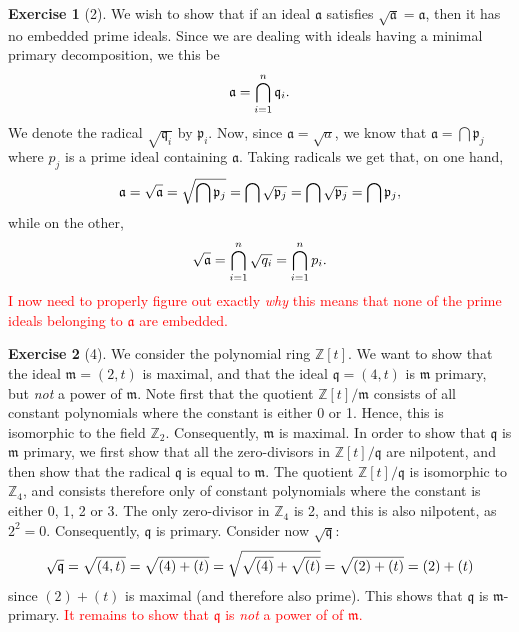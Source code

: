 \documentclass{article}
\theoremstyle{definition}
\newtheorem*{exercise}{Exercise}
\renewcommand{\a}{\mathfrak{a}}
\renewcommand{\p}{\mathfrak{p}}
\renewcommand{\m}{\mathfrak{m}}
\renewcommand{\q}{\mathfrak{q}}
\renewcommand{\rad}[1]{\sqrt{#1}}
\renewcommand{\Z}{\mathbb{Z}}
\begin{document}
\begin{exercise}[2]
    We wish to show that if an ideal $\a$ satisfies $\rad{\a} = \a$, then it
    has no embedded prime ideals. Since we are dealing with ideals having a
    minimal primary decomposition, we this be
    \begin{equation}
        \notag
        \a = \bigcap_{i=1}^n \q_i.
    \end{equation}
    We denote the radical $\rad{\q_i}$ by $\p_i$. Now, since $\a = \rad{a}$, we
    know that $\a = \bigcap \p_j$ where $p_j$ is a prime ideal containing $\a$.
    Taking radicals we get that, on one hand,
    \begin{equation}
        \notag
        \a = \rad{\a} = \rad{\bigcap \p_j} = \bigcap \rad{\p_j} = \bigcap \rad{\p_j} = \bigcap \p_j,
    \end{equation}
    while on the other, 
    \begin{equation}
        \notag
        \rad{\a} = \bigcap_{i=1}^n \rad{q_i} = \bigcap_{i=1}^n
        p_i.
    \end{equation}
    \textcolor{red}{I now need to properly figure out exactly \emph{why} this
    means that none of the prime ideals belonging to $\a$ are embedded.}
\end{exercise}

\begin{exercise}[4]
    We consider the polynomial ring $\Z[t]$. We want to show that the ideal
    $\mathfrak{m} = (2, t)$ is maximal, and that the ideal $\q = (4, t)$ is
    $\m$ primary, but \emph{not} a power of $\m$.  Note first that the quotient
    $\Z[t] / \m$ consists of all constant polynomials where the constant is
    either 0 or 1. Hence, this is isomorphic to the field $\Z_2$. Consequently,
    $\m$ is maximal. In order to show that $\q$ is $\m$ primary, we first show
    that all the zero-divisors in $\Z[t] / \q$ are nilpotent, and then show
    that the radical $\q$ is equal to $\m$. The quotient $\Z[t] / \q$ is
    isomorphic to $\Z_4$, and consists therefore only of constant polynomials
    where the constant is either 0, 1, 2 or 3. The only zero-divisor in $\Z_4$
    is 2, and this is also nilpotent, as $2^2 = 0$. Consequently, $\q$ is
    primary. Consider now $\rad{\q}$:
    \begin{equation}
        \notag
        \rad{\q} = \rad{(4, t)} = \rad{(4) + (t)} = \rad{\rad{(4)} + \rad{(t)}} = \rad{(2) + (t)} = (2) + (t)
    \end{equation}
    since $(2) + (t)$ is maximal (and therefore also prime). This shows that
    $\q$ is $\m$-primary.  \textcolor{red}{It remains to show that $\q$ is
    \emph{not} a power of of $\m$.}
\end{exercise}
\end{document}
